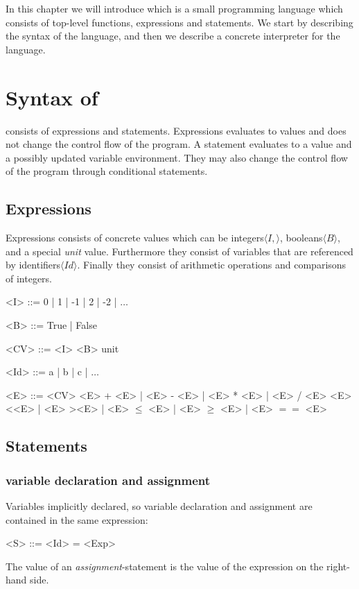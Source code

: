 In this chapter we will introduce \explanguage which is a small programming language which consists of top-level functions, expressions and statements. We start by describing the syntax of the language, and then we describe a concrete interpreter for the language.

\section{Syntax of \explanguage}

\explanguage consists of expressions and statements. Expressions evaluates to values and does not change the control flow of the program. A statement evaluates to a value and a possibly updated variable environment. They may also change the control flow of the program through conditional statements.
 

\subsection{Expressions}


Expressions consists of concrete values which can be integers$\langle I, \rangle$, booleans$\langle B \rangle$, and a special \textsl{unit} value. Furthermore they consist of variables that are referenced by identifiers$\langle Id \rangle$. Finally they consist of arithmetic operations and comparisons of integers. 
\begin{grammar}
	<I> ::= 0 | 1 | -1 | 2 | -2 | $\ldots$
	
	<B> ::= True | False
	
	<CV> ::= <I> 
	\alt unit  
	
	<Id> ::= a | b | c | $\ldots$ 
	
	<E> ::= <CV>
	 + <E> | <E> - <E> | <E> * <E> | <E> / <E>
	 \textless <E> | <E> \textgreater <E> | <E> $\leq$ <E> | <E> $\geq$ <E> | <E> $==$ <E>
\end{grammar}

\subsection{Statements}


\subsubsection{variable declaration and assignment}
Variables implicitly declared, so variable declaration and assignment are contained in the same expression:
\begin{grammar}
	<S> ::= <Id> = <Exp>
\end{grammar} 
The value of an \textsl{assignment}-statement is the value of the expression on the right-hand side.  
